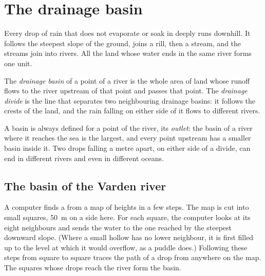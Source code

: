 \section{The drainage basin}

Every drop of rain that does not evaporate or soak in deeply runs downhill.
It follows the steepest slope of the ground, joins a rill, then a stream,
and the streams join into rivers. All the land whose water ends in the same
river forms one unit.

\begin{definition}\label{def:g10:drainage-basins:drainage-basin}
The \emph{drainage basin} of a point of a river is
the whole area of land whose runoff flows to the river upstream of that
point and passes that point. The
\emph{drainage divide} is the line that separates two neighbouring drainage basins: it
follows the crests of the land, and the rain falling on either side of it
flows to different rivers.
\end{definition}

A basin is always defined for a point of the river, its \emph{outlet}: the
basin of a river where it reaches the sea is the largest, and every point
upstream has a smaller basin inside it. Two drops falling a metre apart, on
either side of a divide, can end in different rivers and even in different
oceans.

\subsection*{The basin of the Varden river}

A computer finds a  from a map of heights in a few steps. The
map is cut into small squares, \qty{50}{m} on a side here. For each square,
the computer looks at its eight neighbours and sends the water to the one
reached by the steepest downward slope. (Where a small hollow has no lower
neighbour, it is first filled up to the level at which it would overflow, as
a puddle does.) Following these steps from square to square traces the path
of a drop from anywhere on the map. The squares whose drops reach the river
form the basin.

